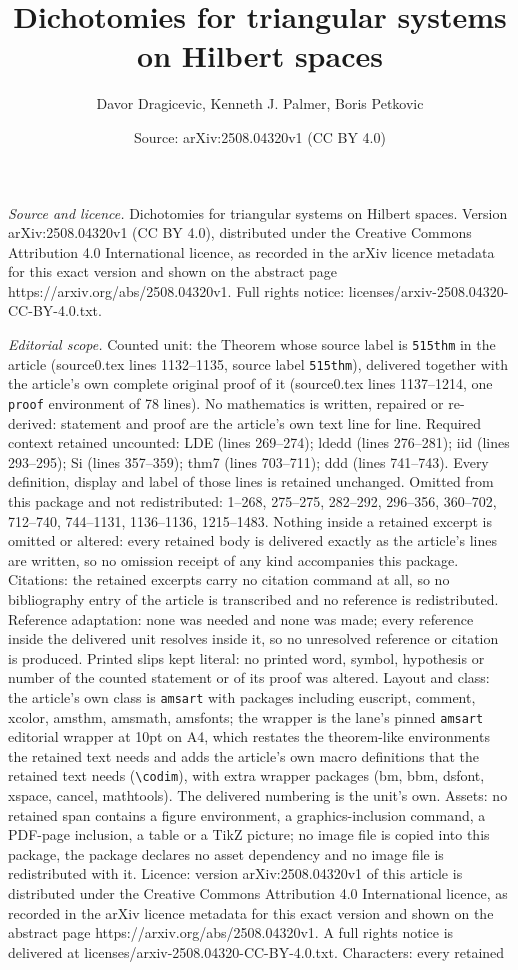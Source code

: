 \documentclass[10pt,a4paper]{amsart}
\title[Dichotomies for triangular systems on Hilbert spaces]{Dichotomies for triangular systems on Hilbert spaces}
\author{Davor Dragicevic, Kenneth J. Palmer, Boris Petkovic}
\date{Source: arXiv:2508.04320v1 (CC BY 4.0)}
\begin{document}
\maketitle

\noindent\emph{Source and licence.} Dichotomies for triangular systems on Hilbert spaces. Version arXiv:2508.04320v1 (CC BY 4.0), distributed under the Creative Commons Attribution 4.0 International licence, as recorded in the arXiv licence metadata for this exact version and shown on the abstract page https://arxiv.org/abs/2508.04320v1. Full rights notice: licenses/arxiv-2508.04320-CC-BY-4.0.txt.\par\smallskip

\noindent\textit{Editorial scope.} Counted unit: the Theorem whose source label is \texttt{515thm} in the article (source0.tex lines 1132--1135, source label \texttt{515thm}), delivered together with the article's own complete original proof of it (source0.tex lines 1137--1214, one \texttt{proof} environment of 78 lines). No mathematics is written, repaired or re-derived: statement and proof are the article's own text line for line. Required context retained uncounted: LDE (lines 269--274); ldedd (lines 276--281); iid (lines 293--295); Si (lines 357--359); thm7 (lines 703--711); ddd (lines 741--743). Every definition, display and label of those lines is retained unchanged. Omitted from this package and not redistributed: 1--268, 275--275, 282--292, 296--356, 360--702, 712--740, 744--1131, 1136--1136, 1215--1483. Nothing inside a retained excerpt is omitted or altered: every retained body is delivered exactly as the article's lines are written, so no omission receipt of any kind accompanies this package. Citations: the retained excerpts carry no citation command at all, so no bibliography entry of the article is transcribed and no reference is redistributed. Reference adaptation: none was needed and none was made; every reference inside the delivered unit resolves inside it, so no unresolved reference or citation is produced. Printed slips kept literal: no printed word, symbol, hypothesis or number of the counted statement or of its proof was altered. Layout and class: the article's own class is \texttt{amsart} with packages including euscript, comment, xcolor, amsthm, amsmath, amsfonts; the wrapper is the lane's pinned \texttt{amsart} editorial wrapper at 10pt on A4, which restates the theorem-like environments the retained text needs and adds the article's own macro definitions that the retained text needs (\texttt{\textbackslash codim}), with extra wrapper packages (bm, bbm, dsfont, xspace, cancel, mathtools). The delivered numbering is the unit's own. Assets: no retained span contains a figure environment, a graphics-inclusion command, a PDF-page inclusion, a table or a TikZ picture; no image file is copied into this package, the package declares no asset dependency and no image file is redistributed with it. Licence: version arXiv:2508.04320v1 of this article is distributed under the Creative Commons Attribution 4.0 International licence, as recorded in the arXiv licence metadata for this exact version and shown on the abstract page https://arxiv.org/abs/2508.04320v1. A full rights notice is delivered at licenses/arxiv-2508.04320-CC-BY-4.0.txt. Characters: every retained 
\end{document}
